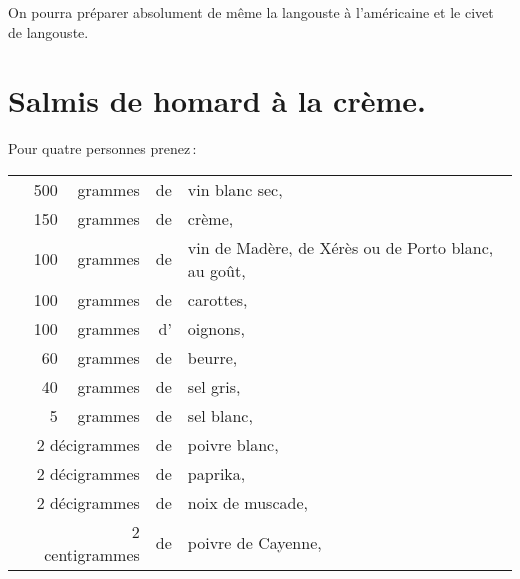 \sk

On pourra préparer absolument de même la langouste à l'américaine et le civet
de langouste.

\section*{\centering Salmis de homard à la crème.}
\label{pg0284} \hypertarget{p0284}{}

Pour quatre personnes prenez :

\medskip

\footnotesize
\begin{longtable}{rrrrp{16em}}   
  &   500 & grammes & de & vin blanc sec,                                                                 \\
  &   150 & grammes & de & crème,                                                                         \\
  &   100 & grammes & de & vin de Madère, de Xérès ou de Porto blanc, au goût,                            \\
  &   100 & grammes & de & carottes,                                                                      \\
  &   100 & grammes & d' & oignons,                                                                       \\
  &    60 & grammes & de & beurre,                                                                        \\
  &    40 & grammes & de & sel gris,                                                                      \\
  &     5 & grammes & de & sel blanc,                                                                     \\
  & \multicolumn{2}{r}{ 2 décigrammes } & de & poivre blanc,                                              \\
  & \multicolumn{2}{r}{ 2 décigrammes } & de & paprika,                                                   \\
  & \multicolumn{2}{r}{ 2 décigrammes } & de & noix de muscade,                                           \\
  & \multicolumn{2}{r}{ 2 centigrammes} & de & poivre de Cayenne,                                         \\

\end{longtable}
